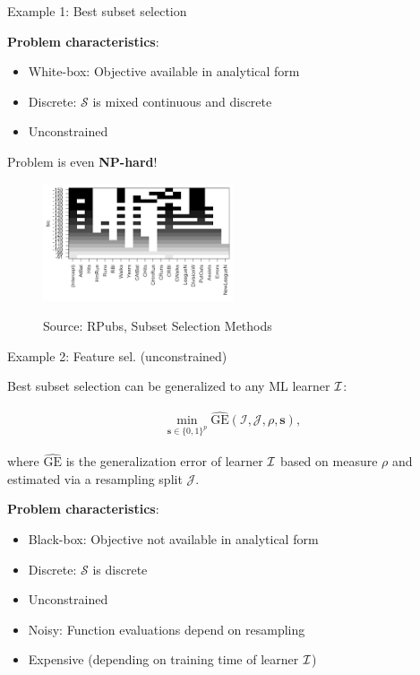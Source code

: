 \begin{vbframe}{Example 1: Best subset selection}
\vspace*{-0.5cm}

\textbf{Problem characteristics}:
\begin{itemize}
	\item White-box: Objective available in analytical form
	\item Discrete: $\mathcal{S}$ is mixed continuous and discrete
	\item Unconstrained
\end{itemize}

Problem is even \textbf{NP-hard}!

\begin{figure}
	\includegraphics[width=0.5\textwidth]{figure_man/subset_selection.png} \\
	\begin{footnotesize}
		Source: RPubs, Subset Selection Methods
	\end{footnotesize}
\end{figure}

\end{vbframe}


	
\begin{vbframe}{Example 2: Feature sel. (unconstrained)}

Best subset selection can be generalized to any ML learner $\mathcal{I}$:

\begin{eqnarray*}
	\min_{\textbf{s} \in \{0, 1\}^p} \widehat{\text{GE}}(\mathcal{I}, \mathcal{J}, \rho, \bm{s}),
\end{eqnarray*}

where $\widehat{\text{GE}}$ is the generalization error of learner $\mathcal{I}$ based on measure $\rho$ and estimated via a resampling split $\mathcal{J}$. 

\lz 

\textbf{Problem characteristics}:
\begin{itemize}
	\item Black-box: Objective not available in analytical form
	\item Discrete: $\mathcal{S}$ is discrete
	\item Unconstrained
	\item Noisy: Function evaluations depend on resampling
	\item Expensive (depending on training time of learner $\mathcal{I}$)
\end{itemize}

\end{vbframe}

